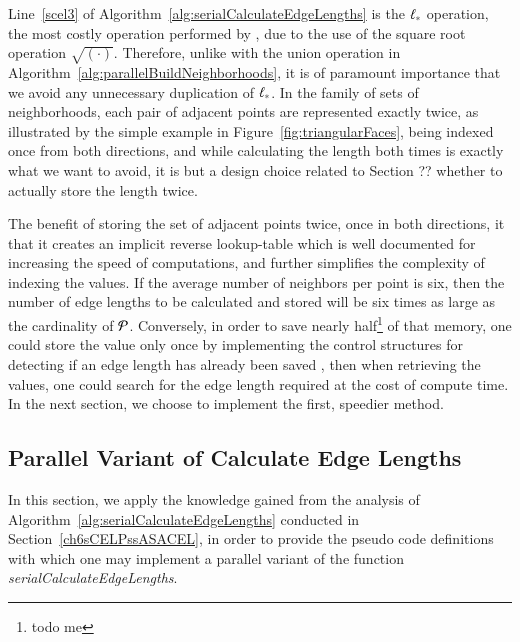 Line~\ref{scel3} of Algorithm~\ref{alg:serialCalculateEdgeLengths} is the $\ell_\ast$ operation, the most costly operation performed by , due to the use of the square root operation $\sqrt{(\cdot)}$. Therefore, unlike with the union operation in Algorithm~\ref{alg:parallelBuildNeighborhoods}, it is of paramount importance that we avoid any unnecessary duplication of $\ell_\ast$.
In the family of sets of neighborhoods, each pair of adjacent points are represented exactly twice, as illustrated by the simple example in Figure~\ref{fig:triangularFaces}, being indexed once from both directions, and while calculating the length both times is exactly what we want to avoid, it is but a design choice related to Section ?? whether to actually store the length twice.

The benefit of storing the set of adjacent points twice, once in both directions, it that it creates an implicit reverse lookup-table which is well documented for increasing the speed of computations, and further simplifies the complexity of indexing the values. If the average number of neighbors per point is six, then the number of edge lengths to be calculated and stored will be six times as large as the cardinality of $\mathcal{P}$. Conversely, in order to save nearly half\footnote{todo me} of that memory, one could store the value only once by implementing the control structures for detecting if an edge length has already been saved , then when retrieving the values, one could search for the edge length required at the cost of compute time. In the next section, we choose to implement the first, speedier method.

%
%
\subsection{Parallel Variant of Calculate Edge Lengths}
\label{ch6sCELPssPVCEL}
In this section, we apply the knowledge gained from the analysis of Algorithm~\ref{alg:serialCalculateEdgeLengths} conducted in Section~\ref{ch6sCELPssASACEL}, in order to provide the pseudo code definitions with which one may implement a parallel variant of the function \textit{serialCalculateEdgeLengths}.

